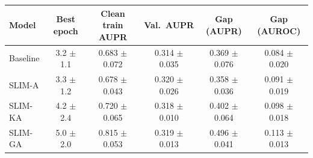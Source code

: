 \begin{tabular}{lccccc}
\toprule
Model & Best epoch & Clean train AUPR & Val.\ AUPR & Gap (AUPR) & Gap (AUROC) \\
\midrule
Baseline & 3.2 $\pm$ 1.1 & 0.683 $\pm$ 0.072 & 0.314 $\pm$ 0.035 & 0.369 $\pm$ 0.076 & 0.084 $\pm$ 0.020 \\
SLIM-A & 3.3 $\pm$ 1.2 & 0.678 $\pm$ 0.043 & 0.320 $\pm$ 0.026 & 0.358 $\pm$ 0.036 & 0.091 $\pm$ 0.019 \\
SLIM-KA & 4.2 $\pm$ 2.4 & 0.720 $\pm$ 0.065 & 0.318 $\pm$ 0.010 & 0.402 $\pm$ 0.064 & 0.098 $\pm$ 0.018 \\
SLIM-GA & 5.0 $\pm$ 2.0 & 0.815 $\pm$ 0.053 & 0.319 $\pm$ 0.013 & 0.496 $\pm$ 0.041 & 0.113 $\pm$ 0.013 \\
\bottomrule
\end{tabular}
